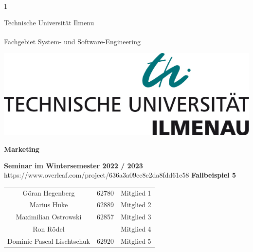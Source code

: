 1\begin{titlepage}
    
    \begin{minipage}[b]{0.625\textwidth}
      Technische Universität Ilmenu\\
      \\
      Fachgebiet System- und Software-Engineering
    \end{minipage}%
    \hfill
    \begin{minipage}[b]{0.375\textwidth}
      \begin{flushright}
        \includegraphics[width=\textwidth]{tu_logo.jpg}
      \end{flushright}
    \end{minipage}
    \vspace*{12\baselineskip}
    
    \begin{centering}
    {\huge \textbf{Marketing}}\\
    \vspace*{1\baselineskip}
    
    {\large \textbf{Seminar im Wintersemester 2022 / 2023}}\\
    \vspace*{9\baselineskip}
    https://www.overleaf.com/project/636a3a09cc8e2da8fdd61e58
    {\LARGE \textbf{Fallbeispiel 5}}\\
    \vspace*{1\baselineskip}
    
    \begin{center}
        \large
        \begin{tabular}{ccc}
            Göran Hegenberg & 62780 & Mitglied 1 \\
            Marius Huke & 62889 & Mitglied 2 \\
            Maximilian Ostrowski & 62857 & Mitglied 3 \\
            Ron Rödel & & Mitglied 4 \\
            Dominic Pascal Lischtschuk & 62920 & Mitglied 5 \\
        \end{tabular}
    \end{center}
    \end{centering}
    
    \restoregeometry
    \end{titlepage}
    
    
    
    \tableofcontents
    \thispagestyle{empty} %
    \pagebreak %